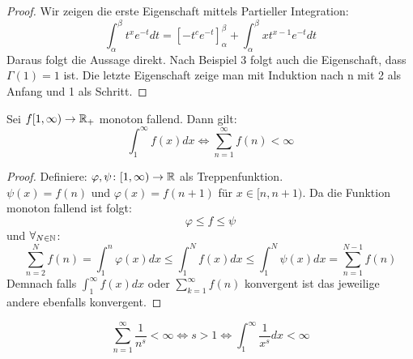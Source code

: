 \begin{proof}
Wir zeigen die erste Eigenschaft mittels Partieller Integration:
\[
	\int_{\alpha}^{\beta} t^x e^{-t} dt = \left[ -t^c e^{-t} \right]_{\alpha}^{\beta} + \int_{\alpha}^{\beta} xt^{x-1} e^{-t} dt
\]
Daraus folgt die Aussage direkt. Nach Beispiel 3 folgt auch die Eigenschaft, dass $\Gamma(1) = 1$ ist. Die letzte Eigenschaft zeige man mit Induktion nach n mit 2 als Anfang und 1 als Schritt. 
\end{proof}
\begin{theorem}
	Sei $f[1,\infty) \to \mathbb{R}_+$ monoton fallend. Dann gilt:
	\[
		\int_1^{\infty} f(x) dx \iff \sum_{n=1}^{\infty}f(n) < \infty
	\]

\end{theorem}
\begin{proof}
Definiere: $\varphi, \psi \colon [1,\infty) \to \mathbb{R} $ als Treppenfunktion. \\
$\psi(x) = f(n)$  und $\varphi (x) = f(n+1)$ für $x \in [n,n+1)$. Da die Funktion monoton fallend ist folgt:
\[
\varphi \le f \le \psi
\]
und $\forall_{N \in \mathbb{N} }$:
\[
\sum_{n=2}^{N}f(n) = \int_1^n \varphi(x)dx \le \int_1^N f(x) dx \le \int_1^N \psi (x) dx = \sum_{n=1}^{N-1}f(n)
\]
Demnach falls $\int_1^{\infty} f(x) dx$ oder $\sum_{k=1}^{\infty} f(n)$ konvergent ist das jeweilige andere ebenfalls konvergent.
\end{proof}
\begin{example}
\[
	\sum_{n=1}^{\infty}\frac{1}{n^s} < \infty \iff s>1 \iff \int_1^{\infty} \frac{1}{x^s}dx < \infty
\]
\end{example}
